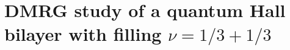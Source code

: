 





\chapter{DMRG study of a quantum Hall bilayer with filling $\nu=1/3+1/3$}
\label{chapter::bilayer}

